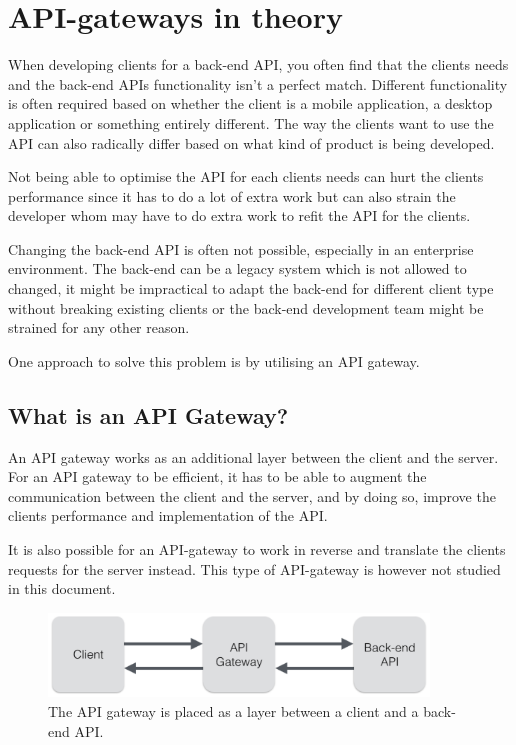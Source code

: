 \documentclass{cslthse-msc}
\begin{document}
\chapter{API-gateways in theory}
When developing clients for a back-end API, you often find that the clients needs and the back-end APIs functionality isn't a perfect match. Different functionality is often required based on whether the client is a mobile application, a desktop application or something entirely different. The way the clients want to use the API can also radically differ based on what kind of product is being developed.

Not being able to optimise the API for each clients needs can hurt the clients performance since it has to do a lot of extra work but can also strain the developer whom may have to do extra work to refit the API for the clients.

Changing the back-end API is often not possible, especially in an enterprise environment. The back-end can be a legacy system which is not allowed to changed, it might be impractical to adapt the back-end for different client type without breaking existing clients or the back-end development team might be strained for any other reason.

One approach to solve this problem is by utilising an API gateway.

\section{What is an API Gateway?}
An API gateway works as an additional layer between the client and the server. For an API gateway to be efficient, it has to be able to augment the communication between the client and the server, and by doing so, improve the clients performance and implementation of the API.

It is also possible for an API-gateway to work in reverse and translate the clients requests for the server instead. This type of API-gateway is however not studied in this document.

\begin{figure}[H]
  \centering
    \begin{center}
      \includegraphics[width=0.9\textwidth]{images/api_gateway.png}
    \end{center}
  \caption{The API gateway is placed as a layer between a client and a back-end API.}
\end{figure}
\end{document}
